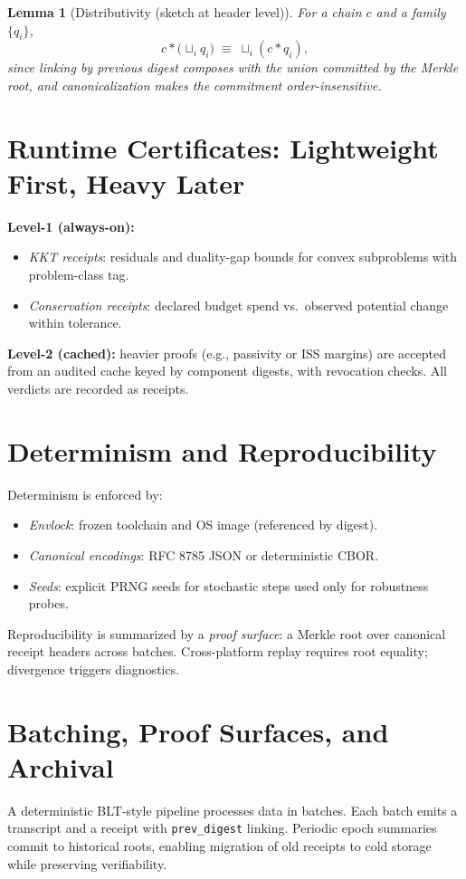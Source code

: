 \documentclass[11pt,a4paper]{article}
\numberwithin{equation}{section}
\theoremstyle{plain}
\newtheorem{lemma}[theorem]{Lemma}
\theoremstyle{definition}
\theoremstyle{remark}
\newcommand{\join}{\sqcup}         %
\begin{document}
\begin{lemma}[Distributivity (sketch at header level)]
For a chain $c$ and a family $\{q_i\}$,
\[
  c * \big(\join_i q_i\big) \;\equiv\; \join_i (c * q_i),
\]
since linking by previous digest composes with the union committed by the Merkle root, and canonicalization makes the commitment order-insensitive.
\end{lemma}

\section{Runtime Certificates: Lightweight First, Heavy Later}
\textbf{Level-1 (always-on):}
\begin{itemize}
  \item \emph{KKT receipts}: residuals and duality-gap bounds for convex subproblems with problem-class tag.
  \item \emph{Conservation receipts}: declared budget spend vs.\ observed potential change within tolerance.
\end{itemize}
\textbf{Level-2 (cached):} heavier proofs (e.g., passivity or ISS margins) are accepted from an audited cache keyed by component digests, with revocation checks. All verdicts are recorded as receipts.

\section{Determinism and Reproducibility}
Determinism is enforced by:
\begin{itemize}
  \item \emph{Envlock}: frozen toolchain and OS image (referenced by digest).
  \item \emph{Canonical encodings}: RFC 8785 JSON or deterministic CBOR.
  \item \emph{Seeds}: explicit PRNG seeds for stochastic steps used only for robustness probes.
\end{itemize}
Reproducibility is summarized by a \emph{proof surface}: a Merkle root over canonical receipt headers across batches. Cross-platform replay requires root equality; divergence triggers diagnostics.

\section{Batching, Proof Surfaces, and Archival}
A deterministic BLT-style pipeline processes data in batches. Each batch emits a transcript and a receipt with \texttt{prev\_digest} linking. Periodic epoch summaries commit to historical roots, enabling migration of old receipts to cold storage while preserving verifiability.
\end{document}
